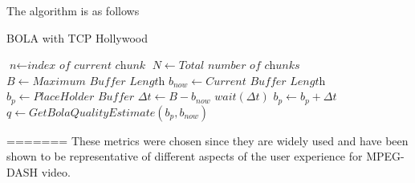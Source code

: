 The algorithm is as follows 

\begin{algorithm}
\caption{BOLA with TCP Hollywood}\label{euclid}
\begin{algorithmic}[1]
\State $\textit{n} \gets \textit{index of current chunk}$
\State $N \gets \textit{Total number of chunks}$
\State $B \gets \textit{Maximum Buffer Length}$
\State $b_{now} \gets \textit{Current Buffer Length}$
\State $b_{p} \gets \textit{PlaceHolder Buffer}$
\State $\Delta t \gets B - b_{now}$
\State $wait (\Delta t)$
\EndIf
\State ${b_{p} \gets b_{p} + \Delta t}$
\State ${q \gets GetBolaQualityEstimate(b_p, b_{now})}$
\EndWhile
\EndWhile
\EndProcedure
\end{algorithmic}
\end{algorithm}
=======
These metrics were chosen since they are widely used and have been shown to
be representative of different aspects of the user experience for MPEG-DASH
video.
